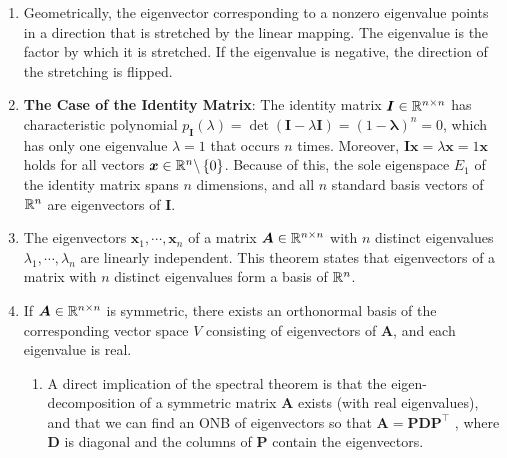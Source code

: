 \begin{enumerate}
    \item Geometrically, the eigenvector corresponding to a nonzero eigenvalue points in a direction that is stretched by the linear mapping.
    The eigenvalue is the factor by which it is stretched. 
    If the eigenvalue is negative, the direction of the stretching is flipped.
    \hfill \cite{mfml/book/mml/Deisenroth-Faisal-Ong}

    \item \textbf{The Case of the Identity Matrix}: The identity matrix $\bm{I} \in \mathbb{R}^{n\times n}$ has characteristic polynomial $p_{\bm{I}} (\lambda ) = \det(\bm{I} -\lambda \bm{I}) = (1-\bm{\lambda }) ^n = 0$, which has only one eigenvalue $\lambda  = 1$ that occurs $n$ times. 
    Moreover, $\bm{Ix} = \lambda \bm{x} = 1\bm{x}$ holds for all vectors $\bm{x} \in \mathbb{R}^n\backslash \left\{0\right\}$. 
    Because of this, the sole eigenspace $E_1$ of the identity matrix spans $n$ dimensions, and all $n$ standard basis vectors of $\mathbb{R}^n$ are eigenvectors of $\bm{I}$.
    \hfill \cite{mfml/book/mml/Deisenroth-Faisal-Ong}

    \item 
    \begin{theorem}
        The eigenvectors $\bm{x}_1, \cdots , \bm{x}_n$ of a matrix $\bm{A} \in \mathbb{R}^{n\times n}$ with $n$ distinct eigenvalues $\lambda _1, \cdots , \lambda _n$ are linearly independent.
        This theorem states that eigenvectors of a matrix with $n$ distinct eigenvalues form a basis of $\mathbb{R}^n$.
        \hfill \cite{mfml/book/mml/Deisenroth-Faisal-Ong}
    \end{theorem}

    \item 
    \begin{theorem}
        If $\bm{A} \in \mathbb{R}^{n\times n}$ is symmetric, there exists an orthonormal basis of the corresponding vector space $V$ consisting of eigenvectors of $\bm{A}$, and each eigenvalue is real.
        \hfill \cite{mfml/book/mml/Deisenroth-Faisal-Ong}
    \end{theorem}
    \begin{enumerate}
        \item A direct implication of the spectral theorem is that the eigen-decomposition of a symmetric matrix $\bm{A}$ exists (with real eigenvalues), and that we can find an ONB of eigenvectors so that $\bm{A} = \bm{PDP}^\top$ , where $\bm{D}$ is diagonal and the columns of $\bm{P}$ contain the eigenvectors.
        \hfill \cite{mfml/book/mml/Deisenroth-Faisal-Ong}
    \end{enumerate}
\end{enumerate}




